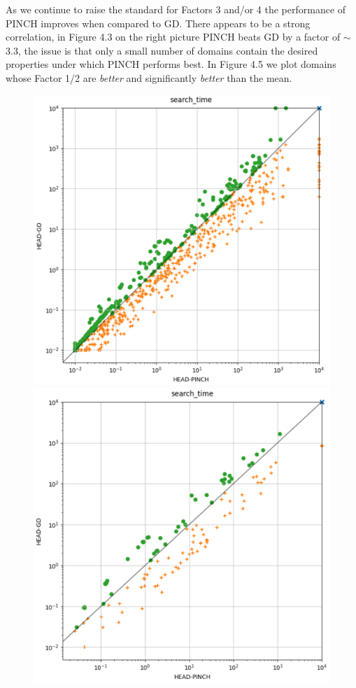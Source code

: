 \newpage
As we continue to raise the standard for Factors 3 and/or 4 the performance of PINCH improves when compared to GD. There appears to be a strong correlation, in Figure 4.3 on the right picture PINCH beats GD by a factor of $\sim$3.3, the issue is that only a small number of domains contain the desired properties under which PINCH performs best. In Figure 4.5 we plot domains whose Factor 1/2 are \textit{better} and significantly \textit{better} than the mean.

\begin{figure}[h]
  \centering
  \begin{minipage}[b]{0.40\textwidth}
    \includegraphics[width=\textwidth]{USETHIS.PNG}
  \end{minipage}
  \hfill
  \begin{minipage}[b]{0.40\textwidth}
    \includegraphics[width=\textwidth]{USETHIS2.PNG}

\end{minipage}
\end{figure}
